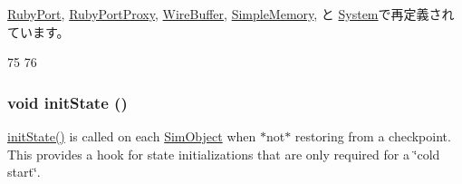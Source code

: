 \hyperlink{classRubyPort_a02fd73d861ef2e4aabb38c0c9ff82947}{RubyPort}, \hyperlink{classRubyPortProxy_a02fd73d861ef2e4aabb38c0c9ff82947}{RubyPortProxy}, \hyperlink{classWireBuffer_a02fd73d861ef2e4aabb38c0c9ff82947}{WireBuffer}, \hyperlink{classSimpleMemory_a02fd73d861ef2e4aabb38c0c9ff82947}{SimpleMemory}, と \hyperlink{classSystem_a02fd73d861ef2e4aabb38c0c9ff82947}{System}で再定義されています。


\begin{DoxyCode}
75 {
76 }
\end{DoxyCode}
\hypertarget{classSimObject_a3c34ea9b29f410748d4435a667484924}{
\subsubsection[{initState}]{\setlength{\rightskip}{0pt plus 5cm}void initState ()}}
\label{classSimObject_a3c34ea9b29f410748d4435a667484924}
\hyperlink{classSimObject_a3c34ea9b29f410748d4435a667484924}{initState()} is called on each \hyperlink{classSimObject}{SimObject} when $\ast$not$\ast$ restoring from a checkpoint. This provides a hook for state initializations that are only required for a \char`\"{}cold start\char`\"{}. 

